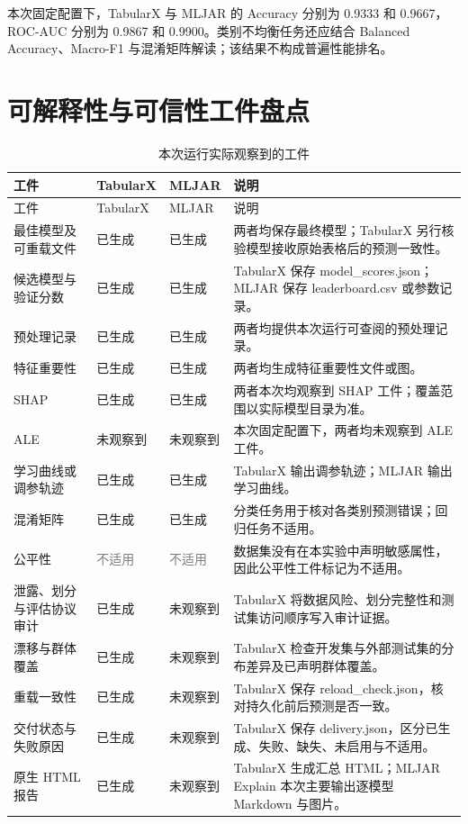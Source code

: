 \documentclass[degree=bachelor,language=chinese,fontset=fandol]{thuthesis}
\newcommand{\yes}{\textcolor{green!50!black}{已生成}}
\newcommand{\no}{\textcolor{red!70!black}{未观察到}}
\newcommand{\na}{\textcolor{gray}{不适用}}
\begin{document}
本次固定配置下，TabularX 与 MLJAR 的 Accuracy 分别为 0.9333 和 0.9667，ROC-AUC 分别为 0.9867 和 0.9900。类别不均衡任务还应结合 Balanced Accuracy、Macro-F1 与混淆矩阵解读；该结果不构成普遍性能排名。

\section{可解释性与可信性工件盘点}
\begin{longtable}{>{\raggedright\arraybackslash}p{}>{\centering\arraybackslash}p{}>{\centering\arraybackslash}p{}>{\raggedright\arraybackslash}p{}}
  \caption{本次运行实际观察到的工件}\label{tab:artifacts}\\
  \toprule
  工件 & TabularX & MLJAR & 说明 \\
  \midrule
  \endfirsthead
  \toprule
  工件 & TabularX & MLJAR & 说明 \\
  \midrule
  \endhead
  最佳模型及可重载文件 & \yes & \yes & 两者均保存最终模型；TabularX 另行核验模型接收原始表格后的预测一致性。 \\
  候选模型与验证分数 & \yes & \yes & TabularX 保存 model\_scores.json；MLJAR 保存 leaderboard.csv 或参数记录。 \\
  预处理记录 & \yes & \yes & 两者均提供本次运行可查阅的预处理记录。 \\
  特征重要性 & \yes & \yes & 两者均生成特征重要性文件或图。 \\
  SHAP & \yes & \yes & 两者本次均观察到 SHAP 工件；覆盖范围以实际模型目录为准。 \\
  ALE & \no & \no & 本次固定配置下，两者均未观察到 ALE 工件。 \\
  学习曲线或调参轨迹 & \yes & \yes & TabularX 输出调参轨迹；MLJAR 输出学习曲线。 \\
  混淆矩阵 & \yes & \yes & 分类任务用于核对各类别预测错误；回归任务不适用。 \\
  公平性 & \na & \na & 数据集没有在本实验中声明敏感属性，因此公平性工件标记为不适用。 \\
  泄露、划分与评估协议审计 & \yes & \no & TabularX 将数据风险、划分完整性和测试集访问顺序写入审计证据。 \\
  漂移与群体覆盖 & \yes & \no & TabularX 检查开发集与外部测试集的分布差异及已声明群体覆盖。 \\
  重载一致性 & \yes & \no & TabularX 保存 reload\_check.json，核对持久化前后预测是否一致。 \\
  交付状态与失败原因 & \yes & \no & TabularX 保存 delivery.json，区分已生成、失败、缺失、未启用与不适用。 \\
  原生 HTML 报告 & \yes & \no & TabularX 生成汇总 HTML；MLJAR Explain 本次主要输出逐模型 Markdown 与图片。 \\
  \bottomrule
\end{longtable}
\end{document}
